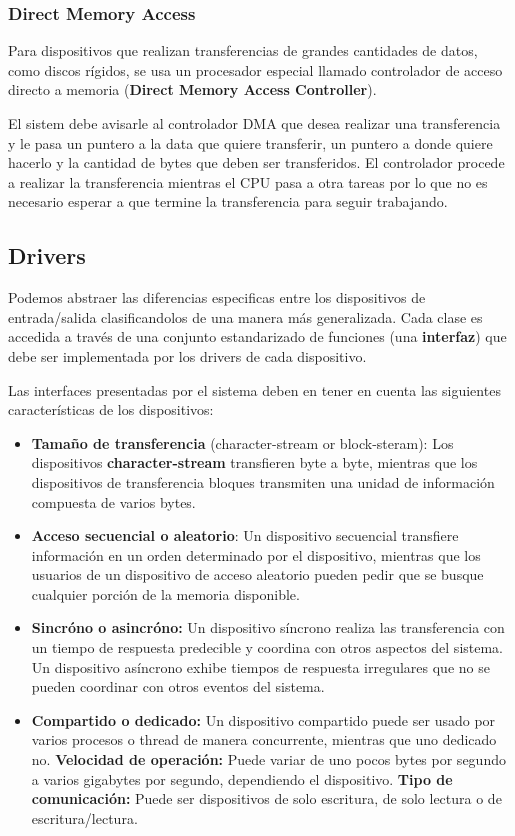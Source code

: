 \subsubsection{Direct Memory Access}
Para dispositivos que realizan transferencias de grandes cantidades de datos, como discos rígidos, se usa un procesador especial llamado controlador de acceso directo a memoria (\textbf{Direct Memory Access Controller}).

El sistem debe avisarle al controlador DMA que desea realizar una transferencia y le pasa un puntero a la data que quiere transferir, un puntero a donde quiere hacerlo y la cantidad de bytes que deben ser transferidos. El controlador procede a realizar la transferencia mientras el CPU pasa a otra tareas por lo que no es necesario esperar a que termine la transferencia para seguir trabajando.

\subsection{Drivers}
Podemos abstraer las diferencias especificas entre los dispositivos de entrada/salida clasificandolos de una manera más generalizada. Cada clase es accedida a través de una conjunto estandarizado de funciones (una \textbf{interfaz}) que debe ser implementada por los drivers de cada dispositivo.

Las interfaces presentadas por el sistema deben en tener en cuenta las siguientes características de los dispositivos:

\begin{itemize}
	\item \textbf{Tamaño de transferencia } (character-stream or block-steram): Los dispositivos \textbf{character-stream} transfieren byte a byte, mientras que los dispositivos de transferencia bloques transmiten una unidad de información compuesta de varios bytes.
	\item \textbf{Acceso secuencial o aleatorio}: Un dispositivo secuencial transfiere información en un orden determinado por el dispositivo, mientras que los usuarios de un dispositivo de acceso aleatorio pueden pedir que se busque cualquier porción de la memoria disponible.
	\item \textbf{Sincróno o asincróno:} Un dispositivo síncrono realiza las transferencia con un tiempo de respuesta predecible y coordina con otros aspectos del sistema. Un dispositivo asíncrono exhibe tiempos de respuesta irregulares que no se pueden coordinar con otros eventos del sistema.
	\item \textbf{Compartido o dedicado:} Un dispositivo compartido puede ser usado por varios procesos o thread de manera concurrente, mientras que uno dedicado no. 
	\textbf{Velocidad de operación:} Puede variar de uno pocos bytes por segundo a varios gigabytes por segundo, dependiendo el dispositivo.
	\textbf{Tipo de comunicación:} Puede ser dispositivos de solo escritura, de solo lectura o de escritura/lectura.
\end{itemize}

